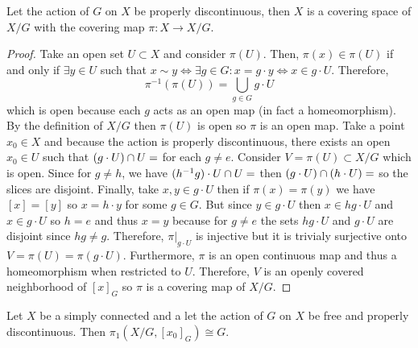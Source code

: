 \documentclass[12pt]{extarticle}
\begin{document}
\begin{lemma}
Let the action of $G$ on $X$ be properly discontinuous, then $X$ is a covering space of $X/G$ with the covering map $\pi : X \to X/G$.
\end{lemma}

\begin{proof}
Take an open set $U \subset X$ and consider $\pi(U)$. Then, $\pi(x) \in \pi(U)$ if and only if $\exists y \in U$ such that $x \sim y \iff \exists g \in G : x = g \cdot y \iff x \in g \cdot U$. Therefore,
\[\pi^{-1}(\pi(U))  = \bigcup_{g \in G} g \cdot U\] which is open because each $g$ acts as an open map (in fact a homeomorphism). By the definition of $X/G$ then $\pi(U)$ is open so $\pi$ is an open map. Take a point $x_0 \in X$ and because the action is properly discontinuous, there exists an open $x_0 \in U$ such that $(g \cdot U) \cap U = \empty$ for each $g \neq e$. Consider $V = \pi(U) \subset X/G$ which is open. Since for $g \neq h$, we have $(h^{-1} g) \cdot U \cap U = \empty$ then $(g \cdot U) \cap (h \cdot U) = \empty$ so the slices are disjoint. Finally, take $x, y \in g \cdot U$ then if $\pi(x) = \pi(y)$ we have $[x] = [y]$ so $x = h \cdot y$ for some $g \in G$. But since $y \in g \cdot U$ then $x \in hg \cdot U$ and $x \in g \cdot U$ so $h = e$ and thus $x = y$ because for $g \neq e$ the sets $hg \cdot U$ and $g \cdot U$ are disjoint since $hg \neq g$. Therefore, $\pi|_{g \cdot U}$ is injective but it is trivialy surjective onto $V = \pi(U) = \pi(g \cdot U)$. Furthermore, $\pi$ is an open continuous map and thus a homeomorphism when restricted to $U$. Therefore, $V$ is an openly covered neighborhood of $[x]_G$ so $\pi$ is a covering map of $X/G$.  
\end{proof}

\newpage

\begin{theorem}
Let $X$ be a simply connected and a let the action of $G$ on $X$ be free and properly discontinuous. Then $\pi_1(X/G, [x_0]_G) \cong G$.
\end{theorem} 
\end{document}
